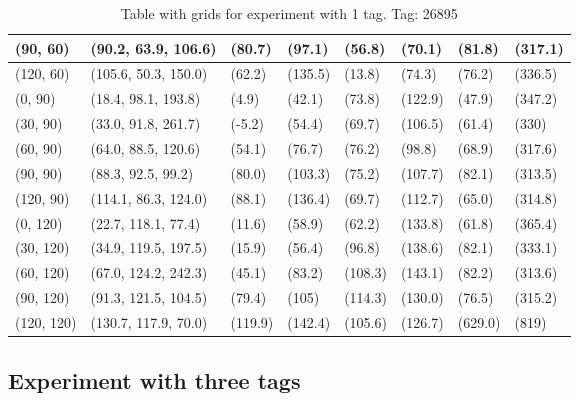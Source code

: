 \begin{table}[H]
\begin{tabular}{|l|l|l|l|l|l|l|l|}
    (90, 60)    & (90.2, 63.9, 106.6)   & (80.7)  & (97.1)  & (56.8)   & (70.1)  & (81.8)  & (317.1)  \\ \hline
    (120, 60)   & (105.6, 50.3, 150.0)  & (62.2)  & (135.5) & (13.8)   & (74.3)  & (76.2)  & (336.5)  \\ \hline
    (0, 90)     & (18.4, 98.1, 193.8)   & (4.9)   & (42.1)  & (73.8)   & (122.9) & (47.9)  & (347.2)  \\ \hline
    (30, 90)    & (33.0, 91.8, 261.7)   & (-5.2)  & (54.4)  & (69.7)   & (106.5) & (61.4)  & (330)    \\ \hline
    (60, 90)    & (64.0, 88.5, 120.6)   & (54.1)  & (76.7)  & (76.2)   & (98.8)  & (68.9)  & (317.6)  \\ \hline
    (90, 90)    & (88.3,  92.5, 99.2)   & (80.0)  & (103.3) & (75.2)   & (107.7) & (82.1)  & (313.5)  \\ \hline
    (120, 90)   & (114.1, 86.3, 124.0)  & (88.1)  & (136.4) & (69.7)   & (112.7) & (65.0)  & (314.8)  \\ \hline
    (0, 120)    & (22.7, 118.1, 77.4)   & (11.6)  & (58.9)  & (62.2)   & (133.8) & (61.8)  & (365.4)  \\ \hline
    (30, 120)   & (34.9, 119.5, 197.5)  & (15.9)  & (56.4)  & (96.8)   & (138.6) & (82.1)  & (333.1)  \\ \hline
    (60, 120)   & (67.0, 124.2, 242.3)  & (45.1)  & (83.2)  & (108.3)  & (143.1) & (82.2)  & (313.6)  \\ \hline
    (90, 120)   & (91.3, 121.5, 104.5)  & (79.4)  & (105)   & (114.3)  & (130.0) & (76.5)  & (315.2)  \\ \hline
    (120, 120)  & (130.7, 117.9, 70.0)  & (119.9) & (142.4) & (105.6)  & (126.7) & (629.0) & (819)    \\ \hline
\end{tabular}
\label{Tab:one-tag-experiment-result}
\caption{Table with grids for experiment with 1 tag. Tag: 26895}
\end{table}

\subsection{Experiment with three tags}
